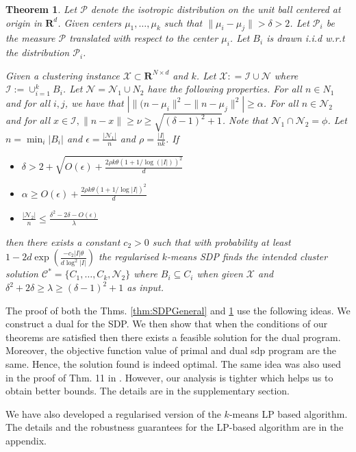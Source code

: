 \documentclass[12pt]{article}
\newcommand{\mc}{\mathcal}
\newcommand{\mb}{\mathbf}
\newtheorem{theorem}{Theorem}
\begin{document}
\begin{theorem}
\label{thm:regularisedSDPGeneral}
Let $\mc P$ denote the isotropic distribution on the unit ball centered at origin in $\mb R^d$. Given centers $\mu_1, \ldots, \mu_k$ such that $\|\mu_i - \mu_j\| > \delta > 2$. Let $\mc P_i$ be the measure $\mc P$ translated with respect to the center $\mu_i$. Let $B_i$ is drawn i.i.d w.r.t the distribution $\mc P_i$. 

Given a clustering instance $\mc X \subset \mb R^{N \times d}$ and $k$. Let $\mc X : = \mc I \cup \mc N$ where $\mc I := \cup_{i=1}^k B_i$. Let $\mc N = \mc N_1 \cup N_2$ have the following properties. For all $n \in N_1$ and for all $i, j$, we have that $| \|(n-\mu_i\|^2 - \|n-\mu_j\|^2| \ge \alpha$. For all $n \in \mc N_2$ and for all $x \in \mc I, \|n- x\| \ge \nu \ge \sqrt{(\delta-1)^2+1}$. Note that $\mc N_1 \cap \mc N_2 = \phi$. Let $n = \min_i |B_i|$ and $\epsilon = \frac{|\mc N_1|}{n}$ and $\rho = \frac{|I|}{nk}$. If  

\begin{itemize}
  \item $\delta > 2 + \sqrt{ O(\epsilon) + \frac{2\rho k\theta(1+1/\log(|I|))^2}{d}}$ 
  \item $\alpha \ge O(\epsilon)+ \frac{2\rho k\theta(1+1/\log|I|)^2}{d}$ 
  \item $\frac{|\mc N_2|}{n} \le \frac{\delta^2-2\delta-O(\epsilon)}{\lambda}$
\end{itemize}
then there exists a constant $c_2 > 0$ such that with probability at least $1 - 2d\exp(\frac{-c_2|I|\theta}{d\log^2|I|})$ the regularised $k$-means SDP finds the intended cluster solution  $\mc C^* = \{C_1, \ldots, C_k, \mc N_2\}$ where $B_i \subseteq C_i$ when given $\mc X$ and $\delta^2+2\delta \ge \lambda \ge (\delta-1)^2 + 1$ as input.
\end{theorem}

The proof of both the Thms. \ref{thm:SDPGeneral} and \ref{thm:regularisedSDPGeneral} use the following ideas. We construct a dual for the SDP. We then show that when the conditions of our theorems are satisfied then there exists a feasible solution for the dual program. Moreover, the objective function value of primal and dual sdp program are the same. Hence, the solution found is indeed optimal. The same idea was also used in the proof of Thm. 11 in \cite{awasthi2015relax}. However, our analysis is tighter which helps us to obtain better bounds. The details are in the supplementary section.

We have also developed a regularised version of the $k$-means LP based algorithm. The details and the robustness guarantees for the LP-based algorithm are in the appendix. 
\end{document}
